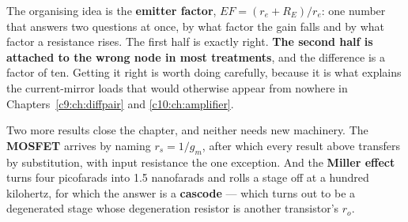 The organising idea is the \textbf{emitter factor}, $EF = (r_e + R_E)/r_e$: one number that
answers two questions at once, by what factor the gain falls and by what factor a resistance rises.
The first half is exactly right. \textbf{The second half is attached to the wrong node in most
treatments}, and the difference is a factor of ten. Getting it right is worth doing carefully,
because it is what explains the current-mirror loads that would otherwise appear from nowhere in
Chapters~\ref{c9:ch:diffpair} and \ref{c10:ch:amplifier}.

Two more results close the chapter, and neither needs new machinery. The \textbf{MOSFET} arrives by
naming $r_s = 1/g_m$, after which every result above transfers by substitution, with input
resistance the one exception. And the \textbf{Miller effect} turns four picofarads into 1.5
nanofarads and rolls a stage off at a hundred kilohertz, for which the answer is a
\textbf{cascode} --- which turns out to be a degenerated stage whose degeneration resistor is
another transistor's $r_o$.





